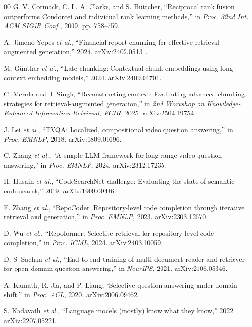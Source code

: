 \documentclass[conference]{IEEEtran}
\begin{document}
\begin{thebibliography}{00}
 G. V. Cormack, C. L. A. Clarke, and S. B\"{u}ttcher, ``Reciprocal rank fusion outperforms Condorcet and individual rank learning methods,'' in \emph{Proc. 32nd Int. ACM SIGIR Conf.}, 2009, pp. 758--759.

 A. Jimeno-Yepes \emph{et al.}, ``Financial report chunking for effective retrieval augmented generation,'' 2024. arXiv:2402.05131.

 M. G\"{u}nther \emph{et al.}, ``Late chunking: Contextual chunk embeddings using long-context embedding models,'' 2024. arXiv:2409.04701.

 C. Merola and J. Singh, ``Reconstructing context: Evaluating advanced chunking strategies for retrieval-augmented generation,'' in \emph{2nd Workshop on Knowledge-Enhanced Information Retrieval, ECIR}, 2025. arXiv:2504.19754.

 J. Lei \emph{et al.}, ``TVQA: Localized, compositional video question answering,'' in \emph{Proc. EMNLP}, 2018. arXiv:1809.01696.

 C. Zhang \emph{et al.}, ``A simple LLM framework for long-range video question-answering,'' in \emph{Proc. EMNLP}, 2024. arXiv:2312.17235.

 H. Husain \emph{et al.}, ``CodeSearchNet challenge: Evaluating the state of semantic code search,'' 2019. arXiv:1909.09436.

 F. Zhang \emph{et al.}, ``RepoCoder: Repository-level code completion through iterative retrieval and generation,'' in \emph{Proc. EMNLP}, 2023. arXiv:2303.12570.

 D. Wu \emph{et al.}, ``Repoformer: Selective retrieval for repository-level code completion,'' in \emph{Proc. ICML}, 2024. arXiv:2403.10059.

 D. S. Sachan \emph{et al.}, ``End-to-end training of multi-document reader and retriever for open-domain question answering,'' in \emph{NeurIPS}, 2021. arXiv:2106.05346.

 A. Kamath, R. Jia, and P. Liang, ``Selective question answering under domain shift,'' in \emph{Proc. ACL}, 2020. arXiv:2006.09462.

 S. Kadavath \emph{et al.}, ``Language models (mostly) know what they know,'' 2022. arXiv:2207.05221.


\end{thebibliography}
\end{document}
